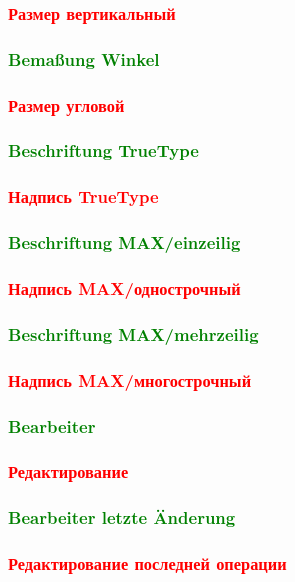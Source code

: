 \documentclass[14pt,a4paper]{book}
\newcommand{\DE}[1]{\textcolor{green}{#1}}
\newcommand{\RU}[1]{\textcolor{red}{#1}}
\begin{document}
			\RU{\subsubsection{Размер вертикальный}}
			\DE{\subsubsection{Bemaßung Winkel}}
			\RU{\subsubsection{Размер угловой}}
			\DE{\subsubsection{Beschriftung TrueType}} 
			\RU{\subsubsection{Надпись TrueType}} 
			\DE{\subsubsection{Beschriftung MAX/einzeilig}} 
			\RU{\subsubsection{Надпись MAX/однострочный}} 
			\DE{\subsubsection{Beschriftung MAX/mehrzeilig}}
			\RU{\subsubsection{Надпись MAX/многострочный}}
			\DE{\subsubsection{Bearbeiter}}
			\RU{\subsubsection{Редактирование}}
			\DE{\subsubsection{Bearbeiter letzte Änderung}}
			\RU{\subsubsection{Редактирование последней операции}}
\end{document}
